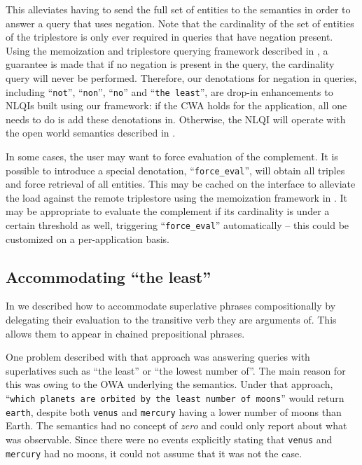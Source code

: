 \documentclass[../main.tex]{subfiles}
\begin{document}
\begin{refsection}
This alleviates having to send the full set of entities to the semantics in order to answer a query that uses negation. Note that the cardinality of the set of entities of the triplestore is only ever required in queries that have negation present.  Using the memoization and triplestore querying framework described in \cite{peelar2020webistjournal}, a guarantee is made that if no negation is present in the query, the cardinality query will never be performed.  Therefore, our denotations for negation in queries, including ``\texttt{not}'', ``\texttt{non}'', ``\texttt{no}'' and ``\texttt{the least}'', are drop-in enhancements to NLQIs built using our framework: if the CWA holds for the application, all one needs to do is add these denotations in.  Otherwise, the NLQI will operate with the open world semantics described in \cite{frostpeelar2019}.

In some cases, the user may want to force evaluation of the complement.  It is possible to introduce a special denotation, ``\texttt{force\_eval}'', will obtain all triples and force retrieval of all entities.  This may be cached on the interface to alleviate the load against the remote triplestore using the memoization framework in \cite{frostpeelar2019}.  It may be appropriate to evaluate the complement if its cardinality is under a certain threshold as well, triggering ``\texttt{force\_eval}'' automatically -- this could be customized on a per-application basis.

\subsection{Accommodating ``the least''} %

In \cite{frostpeelar2019} we described how to accommodate superlative phrases compositionally by
delegating their evaluation to the transitive verb they are arguments of.  This allows them to appear in chained prepositional phrases.

One problem described with that approach was answering queries with superlatives such as ``the least'' or ``the lowest number of''.  The main reason for this was owing to the OWA underlying the semantics.  Under that approach, ``\texttt{which planets are orbited by the least number of moons}'' would return \texttt{earth}, despite both \texttt{venus} and \texttt{mercury} having a lower number of moons than Earth.  The semantics had no concept of \textit{zero} and could only report about what was observable.  Since there were no events explicitly stating that \texttt{venus} and \texttt{mercury} had no moons, it could not assume that it was not the case.


\end{refsection}
\end{document}
